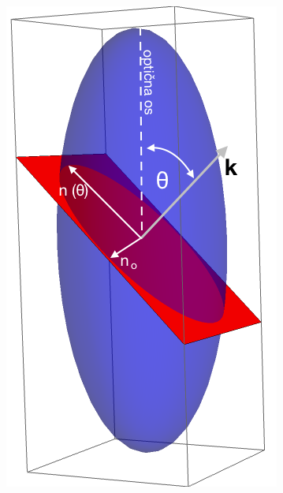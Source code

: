 \documentclass[longbibliography,slovene,a4paper,12pt]{book}
\begin{document}
\begin{figure}[h!]
	\centering
	\begin{subfigure}[b]{0.25\textwidth}
	\includegraphics[width=\textwidth]{slike/ellipsoid.png}
	\label{fig:indexellipsoid}
	\end{subfigure}\qquad
	\begin{subfigure}[b]{0.55\textwidth}

\end{subfigure}
\end{figure}
\end{document}
